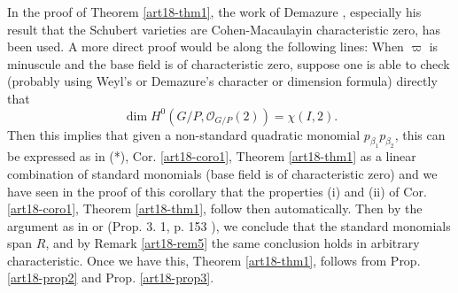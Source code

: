 \begin{remark}\label{art18-rem8}
In the proof of Theorem \ref{art18-thm1}, the work of Demazure \cite{art18-key8}, especially his result that the Schubert varieties are Cohen-Macaulay\pageoriginale in characteristic zero, has been used. A more direct proof would be along the following lines: When $\varpi$ is minuscule and the base field is of characteristic zero, suppose one is able to check (probably using Weyl's or Demazure's character or dimension formula) directly that 
$$
\dim H^0(G/P,\mathscr{O}_{G/P}(2)) = \chi(I, 2).
$$
Then this implies that given a non-standard quadratic monomial $p_{\beta_1} p_{\beta_2}$, this can be expressed as in (*), Cor. \ref{art18-coro1}, Theorem \ref{art18-thm1} as a linear combination of standard monomials (base field is of characteristic zero) and we have seen in the proof of this corollary that the properties (i) and (ii) of Cor. \ref{art18-coro1}, Theorem \ref{art18-thm1}, follow then automatically. Then by the argument as in \cite{art18-key10} or (Prop. 3. 1, p. 153 \cite{art18-key13}), we conclude that the standard monomials span $R$, and by Remark \ref{art18-rem5} the same conclusion holds in arbitrary characteristic. Once we have this, Theorem \ref{art18-thm1}, follows from Prop. \ref{art18-prop2} and Prop. \ref{art18-prop3}.
\end{remark}

